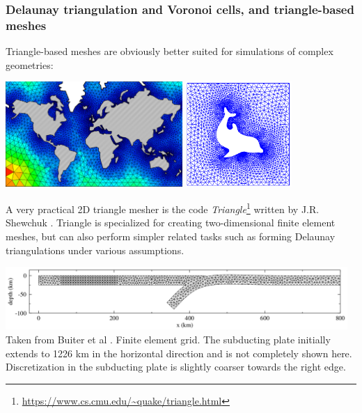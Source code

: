 
\subsubsection{Delaunay triangulation and Voronoi cells, and triangle-based meshes}

Triangle-based meshes are obviously better suited for simulations of complex geometries:
\begin{center}
\includegraphics[height=4cm]{images/meshes/tr1.png}
\includegraphics[height=4cm]{images/meshes/dolfin.png}
\end{center}

A very practical 2D triangle mesher is the code {\sl Triangle}\footnote{\url{https://www.cs.cmu.edu/~quake/triangle.html}}
written by J.R. Shewchuk \cite{shew96}.
Triangle is specialized for creating two-dimensional finite element meshes, but can also perform simpler related tasks such as forming Delaunay triangulations under various assumptions.

\begin{center}
\includegraphics[width=13cm]{images/meshes/bugw01}\\
{\small Taken from Buiter et al \cite{bugw01}. Finite element grid. 
The subducting plate initially extends to 1226 km in the horizontal direction and 
is not completely shown here. Discretization in the subducting plate is slightly coarser 
towards the right edge.}
\end{center}



